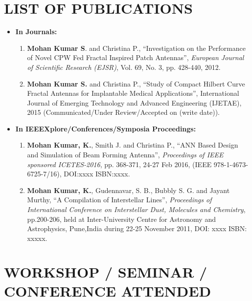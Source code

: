 \section*{LIST OF PUBLICATIONS}
\begin{itemize}
	\item \textbf{In Journals: }
	\begin{enumerate}
		\item \textbf{Mohan Kumar S}. and Christina P., “Investigation on the Performance of Novel CPW Fed Fractal Inspired Patch Antennas”, \textit{European Journal of Scientific Research (EJSR)}, Vol. 69, No. 3, pp. 428-440, 2012.
		\item \textbf{Mohan Kumar S.} and Christina P., “Study of Compact Hilbert Curve Fractal Antennas for Implantable Medical Applications”, International Journal of Emerging Technology and Advanced Engineering (IJETAE), 2015 (Communicated/Under Review/Accepted on (write date)).
	\end{enumerate}
	\item \textbf{In IEEEXplore/Conferences/Symposia Proceedings:}
	\begin{enumerate}
		\item \textbf{Mohan Kumar, K.}, Smith J. and Christina P., “ANN Based Design and Simulation of Beam Forming Antenna”, \textit{Proceedings of IEEE sponsored ICETES-2016}, pp. 368-371, 24-27 Feb 2016, (IEEE 978-1-4673-6725-7/16), DOI:xxxx ISBN:xxxx.
		\item \textbf{Mohan Kumar, K.}, Gudennavar, S. B., Bubbly S. G. and Jayant Murthy, “A Compilation of Interstellar Lines”, \textit{Proceedings of International Conference on Interstellar Dust, Molecules and Chemistry}, pp.200-206, held at Inter-University Centre for Astronomy and Astrophysics, Pune,India during 22-25 November 2011, DOI: xxxx ISBN: xxxxx.
	\end{enumerate}
\end{itemize}

\section*{WORKSHOP / SEMINAR / CONFERENCE ATTENDED}

